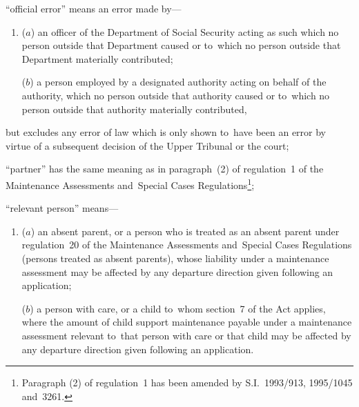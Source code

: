 \documentclass[12pt,a4paper]{article}
\begin{document}
\begin{enumerate}

“official error” means an error made by—
\begin{enumerate}\item[]
    ($a$) 
    an officer of the Department of Social Security acting as such which no person outside that Department caused or to~which no person outside that Department materially contributed;


($b$) a person employed by a designated authority acting on behalf of the authority, which no person outside that authority caused or to~which no person outside that authority materially contributed,
\end{enumerate}
but excludes any error of law which is only shown to~have been an error by virtue of a subsequent decision of 
the Upper Tribunal  %
or the court;

“partner” has the same meaning as in paragraph~(2) of regulation~1 of the
Maintenance Assessments and~Special Cases Regulations\footnote{\frenchspacing Paragraph (2) of regulation~1 has been amended by S.I.~1993/913, 1995/1045 and~3261.};

“relevant person” means—
\begin{enumerate}\item[]
($a$) an absent parent, or a person who is treated as an absent parent under
regulation~20 of the Maintenance Assessments and~Special Cases Regulations
(persons treated as absent parents), whose liability under a maintenance
assessment may be affected by any departure direction given following an
application;

($b$) a person with care, or a child to~whom section~7 of the Act applies, where
the amount of child support maintenance payable under a maintenance assessment
relevant to~that person with care or that child may be affected by any departure
direction given following an application.
\end{enumerate}
\end{enumerate}
\end{document}
